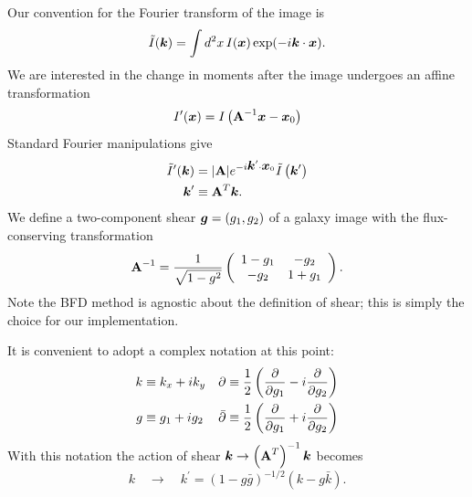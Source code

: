 \documentclass[11pt,preprint,flushrt]{aastex}
\newcommand{\vecg}{\mbox{\boldmath $g$}}
\newcommand{\vecx}{\mbox{\boldmath $x$}}
\newcommand{\veck}{\mbox{\boldmath $k$}}
\newcommand{\matA}{\mbox{$\bf A$}}
\begin{document}
Our convention for the Fourier transform of the image is
\begin{equation}
\tilde I(\veck) = \int d^2x\, I(\vecx) \exp(-i\veck\cdot\vecx).
\end{equation}
We are interested in the change in moments after the image undergoes
an affine transformation
\begin{equation}
I^\prime(\vecx) = I\left(\matA^{-1}\vecx-\vecx_0\right)
\end{equation}
Standard Fourier manipulations give
\begin{align}
\tilde I^\prime(\veck) & = |\matA| e^{-i\veck^\prime\cdot\vecx_0} \tilde
I\left(\veck^\prime\right) \\
\veck^\prime &\equiv \matA^T \veck.
\end{align}
We define a two-component shear $\vecg=(g_1,g_2)$ of a galaxy image
with the flux-conserving transformation 
\begin{equation}
\matA^{-1} = 
\frac{1}{\sqrt{1-g^2}} \left( \begin{array}{cc}
1 - g_1 & -g_2 \\
-g_2 & 1 + g_1
\end{array}
\right).
\end{equation}
Note the BFD method is agnostic about the definition of shear; this is
simply the choice for our implementation.

It is convenient to adopt a complex notation at this point:
\begin{align}
k & \equiv k_x + ik_y  &\partial & \equiv \frac{1}{2}\left(\frac{\partial}{\partial g_1} - i \frac{\partial}{\partial
  g_2}\right)  \notag \\
g & \equiv g_1 + i g_2 &
\bar \partial &\equiv \frac{1}{2}\left(\frac{\partial}{\partial g_1} + i \frac{\partial}{\partial
  g_2} \right)
\end{align}
With this notation the action of shear $\veck\rightarrow
\left(\matA^T\right)^{-1}\veck$ becomes
\begin{equation}
k \quad \rightarrow \quad k^\prime = \left( 1- g\bar g\right)^{-1/2} \left( k - g \bar
  k\right).
\label{shearcomplex}
\end{equation}
\end{document}
